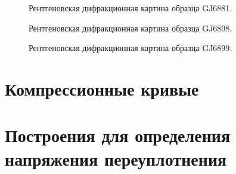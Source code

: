  \begin{figure}[ht]
    \caption{Рентгеновская дифракционная картина образца GJ6881.}\label{fig:fig}
  \end{figure}

  \begin{figure}[ht]
    \caption{Рентгеновская дифракционная картина образца GJ6898.}\label{fig:fig}
  \end{figure}

  \begin{figure}[ht]
    \caption{Рентгеновская дифракционная картина образца GJ6899.}\label{fig:fig}
  \end{figure}

  \chapter{Компрессионные кривые}\label{app:oedometer}
  

  \chapter{Построения для определения напряжения переуплотнения}\label{app:method}
  